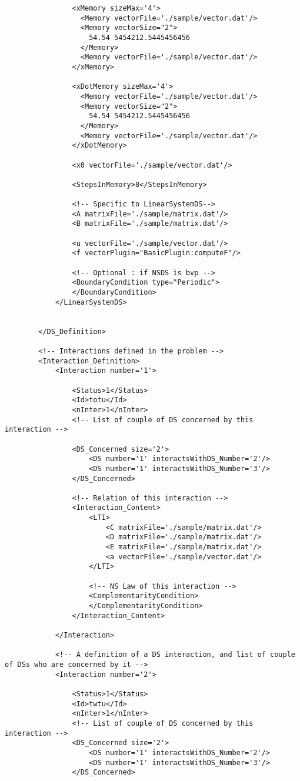 \begin{verbatim}
				<xMemory sizeMax='4'>				
				  <Memory vectorFile='./sample/vector.dat'/>
				  <Memory vectorSize="2">
				  	54.54 5454212.5445456456
				  </Memory>
				  <Memory vectorFile='./sample/vector.dat'/>				  				  
				</xMemory>
				  
				<xDotMemory sizeMax='4'>
				  <Memory vectorFile='./sample/vector.dat'/>
				  <Memory vectorSize="2">
				  	54.54 5454212.5445456456
				  </Memory>
				  <Memory vectorFile='./sample/vector.dat'/>				  				  
				</xDotMemory>

				<x0 vectorFile='./sample/vector.dat'/>
				
				<StepsInMemory>8</StepsInMemory>				
				
				<!-- Specific to LinearSystemDS-->
				<A matrixFile='./sample/matrix.dat'/>
				<B matrixFile='./sample/matrix.dat'/>
				
				<u vectorFile='./sample/vector.dat'/>								
				<f vectorPlugin="BasicPlugin:computeF"/>
				
				<!-- Optional : if NSDS is bvp -->
				<BoundaryCondition type="Periodic">				
				</BoundaryCondition>
			</LinearSystemDS>

			
		</DS_Definition>

		<!-- Interactions defined in the problem -->		
		<Interaction_Definition>
			<Interaction number='1'>
				
				<Status>1</Status>
				<Id>totu</Id>
				<nInter>1</nInter>
				<!-- List of couple of DS concerned by this interaction -->			

				<DS_Concerned size='2'>
					<DS number='1' interactsWithDS_Number='2'/>			
					<DS number='1' interactsWithDS_Number='3'/>
				</DS_Concerned>					
											
				<!-- Relation of this interaction -->				
				<Interaction_Content>
					<LTI>
						<C matrixFile='./sample/matrix.dat'/>
						<D matrixFile='./sample/matrix.dat'/>
						<E matrixFile='./sample/matrix.dat'/>
						<a vectorFile='./sample/vector.dat'/>
					</LTI>			
	
					<!-- NS Law of this interaction -->				
					<ComplementarityCondition>
					</ComplementarityCondition>
				</Interaction_Content>
					
			</Interaction>
			
			<!-- A definition of a DS interaction, and list of couple of DSs who are concerned by it -->			
			<Interaction number='2'>

				<Status>1</Status>
				<Id>twtu</Id>
				<nInter>1</nInter>
				<!-- List of couple of DS concerned by this interaction -->			
				<DS_Concerned size='2'>
					<DS number='1' interactsWithDS_Number='2'/>		
					<DS number='1' interactsWithDS_Number='3'/>				
				</DS_Concerned>					
			

\end{verbatim}
